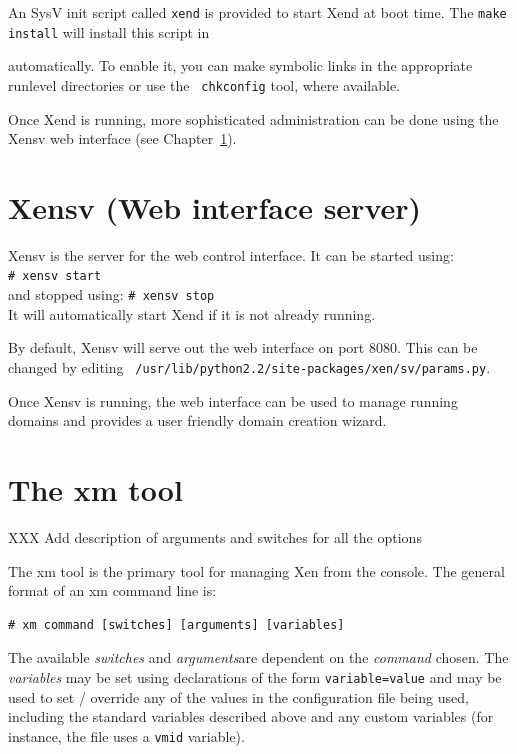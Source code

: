 \documentclass[11pt,twoside,final,openright]{xenstyle}
\begin{document}
An SysV init script called {\tt xend} is provided to start Xend at
boot time.  The {\tt make install} will install this script in
{ automatically.  To enable it, you can make
symbolic links in the appropriate runlevel directories or use the {\tt
chkconfig} tool, where available.

Once Xend is running, more sophisticated administration can be done
using the Xensv web interface (see Chapter~\ref{cha:xensv}).

\chapter{Xensv (Web interface server)}
\label{cha:xensv}

Xensv is the server for the web control interface.  It can be started
using:\\
\verb_# xensv start_ \\
and stopped using:
\verb_# xensv stop_ \\
It will automatically start Xend if it is not already running.

By default, Xensv will serve out the web interface on port 8080.  This
can be changed by editing {\tt
/usr/lib/python2.2/site-packages/xen/sv/params.py}.

Once Xensv is running, the web interface can be used to manage running
domains and provides a user friendly domain creation wizard.

\chapter{The xm tool}
\label{cha:xm}

XXX Add description of arguments and switches for all the options

The xm tool is the primary tool for managing Xen from the console.
The general format of an xm command line is:

\begin{verbatim}
# xm command [switches] [arguments] [variables]
\end{verbatim}

The available {\em switches } and {\em arguments}are dependent on the
{\em command} chosen.  The {\em variables} may be set using
declarations of the form {\tt variable=value} and may be used to set /
override any of the values in the configuration file being used,
including the standard variables described above and any custom
variables (for instance, the  file uses a {\tt vmid}
variable).

}
\end{document}
